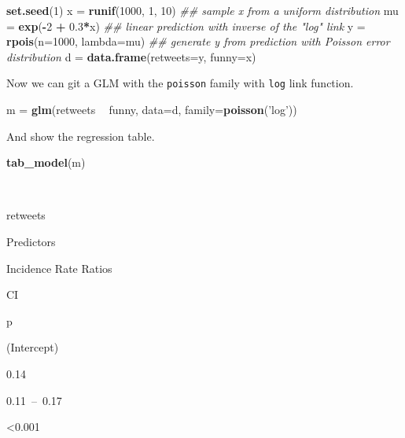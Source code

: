 \documentclass[
]{article}
\newenvironment{Shaded}{\begin{snugshade}}{\end{snugshade}}
\newcommand{\CommentTok}[1]{\textcolor[rgb]{0.56,0.35,0.01}{\textit{#1}}}
\newcommand{\DataTypeTok}[1]{\textcolor[rgb]{0.13,0.29,0.53}{#1}}
\newcommand{\DecValTok}[1]{\textcolor[rgb]{0.00,0.00,0.81}{#1}}
\newcommand{\FloatTok}[1]{\textcolor[rgb]{0.00,0.00,0.81}{#1}}
\newcommand{\KeywordTok}[1]{\textcolor[rgb]{0.13,0.29,0.53}{\textbf{#1}}}
\newcommand{\NormalTok}[1]{#1}
\newcommand{\OperatorTok}[1]{\textcolor[rgb]{0.81,0.36,0.00}{\textbf{#1}}}
\newcommand{\StringTok}[1]{\textcolor[rgb]{0.31,0.60,0.02}{#1}}
\begin{document}
\begin{Shaded}
\begin{Highlighting}[]
\KeywordTok{set.seed}\NormalTok{(}\DecValTok{1}\NormalTok{)}
\NormalTok{x =}\StringTok{ }\KeywordTok{runif}\NormalTok{(}\DecValTok{1000}\NormalTok{, }\DecValTok{1}\NormalTok{, }\DecValTok{10}\NormalTok{)        }\CommentTok{## sample x from a uniform distribution}
\NormalTok{mu =}\StringTok{ }\KeywordTok{exp}\NormalTok{(}\OperatorTok{-}\DecValTok{2} \OperatorTok{+}\StringTok{ }\FloatTok{0.3}\OperatorTok{*}\NormalTok{x)          }\CommentTok{## linear prediction with inverse of the "log" link}
\NormalTok{y =}\StringTok{ }\KeywordTok{rpois}\NormalTok{(}\DataTypeTok{n=}\DecValTok{1000}\NormalTok{, }\DataTypeTok{lambda=}\NormalTok{mu)  }\CommentTok{## generate y from prediction with Poisson error distribution}
\NormalTok{d =}\StringTok{ }\KeywordTok{data.frame}\NormalTok{(}\DataTypeTok{retweets=}\NormalTok{y, }\DataTypeTok{funny=}\NormalTok{x)}
\end{Highlighting}
\end{Shaded}

Now we can git a GLM with the \texttt{poisson} family with \texttt{log}
link function.

\begin{Shaded}
\begin{Highlighting}[]
\NormalTok{m =}\StringTok{ }\KeywordTok{glm}\NormalTok{(retweets }\OperatorTok{~}\StringTok{ }\NormalTok{funny, }\DataTypeTok{data=}\NormalTok{d, }\DataTypeTok{family=}\KeywordTok{poisson}\NormalTok{(}\StringTok{'log'}\NormalTok{))}
\end{Highlighting}
\end{Shaded}

And show the regression table.

\begin{Shaded}
\begin{Highlighting}[]
\KeywordTok{tab_model}\NormalTok{(m)}
\end{Highlighting}
\end{Shaded}

~

retweets

Predictors

Incidence Rate Ratios

CI

p

(Intercept)

0.14

0.11~--~0.17

\textless0.001
\end{document}
